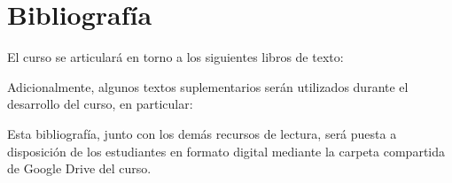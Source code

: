 
\section{Bibliografía}

\nocite{*}

El curso se articulará en torno a los siguientes libros de texto:

%
\printbibliography[
    heading=none,
    keyword=base
]

Adicionalmente, algunos textos suplementarios serán utilizados
durante el desarrollo del curso, en particular:

\printbibliography[
    heading=none,
    notkeyword=base
]

Esta bibliografía, junto con los demás recursos de lectura, será
puesta a disposición de los estudiantes en formato digital mediante
la carpeta compartida de Google Drive del curso.